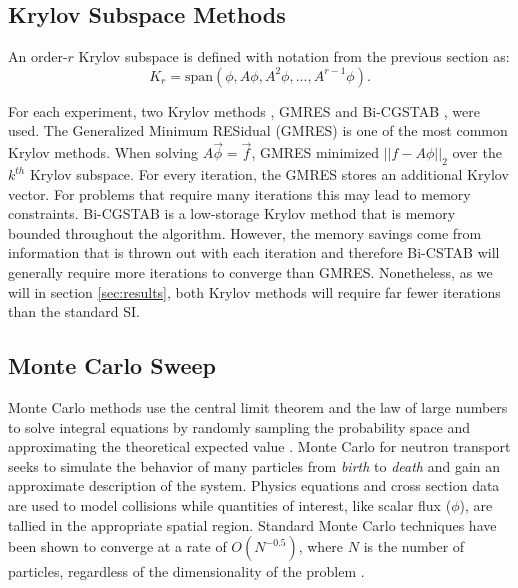  

\subsection{Krylov Subspace Methods}

An order-$r$ Krylov subspace is defined with notation from the previous section as:
\begin{equation}
K_r = \textrm{span}(\phi, A\phi, A^{2}\phi, ..., A^{r-1}\phi).
\end{equation}

For each experiment, two Krylov methods \cite{ctk:roots}, GMRES \cite{gmres} and Bi-CGSTAB \cite{bicgstab}, were used. The Generalized Minimum RESidual (GMRES) is one of the most common Krylov methods. When solving $A\vec{\phi}=\vec{f}$, GMRES minimized $||f-A\phi||_2$ over the $k^{th}$ Krylov subspace. For every iteration, the GMRES stores an additional Krylov vector. For problems that require many iterations this may lead to memory constraints. Bi-CGSTAB is a low-storage Krylov method that is memory bounded throughout the algorithm. However, the memory savings come from information that is thrown out with each iteration and therefore Bi-CSTAB will generally require more iterations to converge than GMRES. Nonetheless, as we will in section \ref{sec:results}, both Krylov methods will require far fewer iterations than the standard SI. 



\subsection{Monte Carlo Sweep}

Monte Carlo methods use the central limit theorem and the law of large numbers to solve integral equations by randomly sampling the probability space and approximating the theoretical expected value \cite{Lux1991, Murray1977}. Monte Carlo for neutron transport seeks to simulate the behavior of many particles from \textit{birth} to \textit{death} and gain an approximate description of the system. Physics equations and cross section data are used to model collisions while quantities of interest, like scalar flux ($\phi$), are tallied in the appropriate spatial region. Standard Monte Carlo techniques have been shown to converge at a rate of $O(N^{-0.5})$, where $N$ is the number of particles, regardless of the dimensionality of the problem \cite{Brown2005, Brown2006, Brown2016}. 

